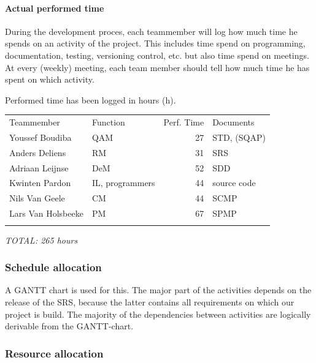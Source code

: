 \documentclass[12pt]{article}
\begin{document}
\paragraph{Actual performed time}\label{actual-performed-time}

During the development proces, each teammember will log how much time he
spends on an activity of the project. This includes time spend on
programming, documentation, testing, versioning control, etc. but also
time spend on meetings. At every (weekly) meeting, each team member
should tell how much time he has spent on which activity.

Performed time has been logged in hours (h). 

\begin{longtable}[c]{@{}llrl@{}}
\hline\noalign{\medskip}
Teammember & Function & Perf. Time & Documents
\\\noalign{\medskip}
\hline\noalign{\medskip}
Youssef Boudiba & QAM & 27 & STD, (SQAP)
\\\noalign{\medskip}
Anders Deliens & RM & 31 & SRS
\\\noalign{\medskip}
Adriaan Leijnse & DeM & 52 & SDD
\\\noalign{\medskip}
Kwinten Pardon & IL, programmers & 44 & source code
\\\noalign{\medskip}
Nils Van Geele & CM & 44 & SCMP
\\\noalign{\medskip}
Lars Van Holsbeeke & PM & 67 & SPMP
\\\noalign{\medskip}
\hline
\end{longtable}

\emph{TOTAL: 265 hours}

\subsubsection{Schedule allocation}\label{schedule-allocation}

A GANTT chart is used for this. The major part of the activities depends
on the release of the SRS, because the latter contains all requirements
on which our project is build. The majority of the dependencies between
activities are logically derivable from the GANTT-chart.



\subsubsection{Resource allocation}\label{resource-allocation}
\end{document}
